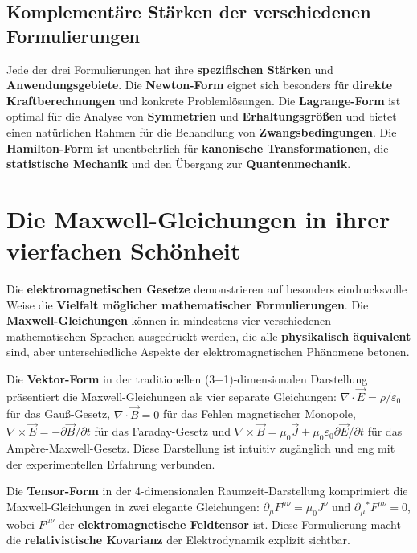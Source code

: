 \documentclass[12pt,a4paper]{report}
\begin{document}
	\subsection{Komplementäre Stärken der verschiedenen Formulierungen}
	
	Jede der drei Formulierungen hat ihre \textbf{spezifischen Stärken} und \textbf{Anwendungsgebiete}. Die \textbf{Newton-Form} eignet sich besonders für \textbf{direkte Kraftberechnungen} und konkrete Problemlösungen. Die \textbf{Lagrange-Form} ist optimal für die Analyse von \textbf{Symmetrien} und \textbf{Erhaltungsgrößen} und bietet einen natürlichen Rahmen für die Behandlung von \textbf{Zwangsbedingungen}. Die \textbf{Hamilton-Form} ist unentbehrlich für \textbf{kanonische Transformationen}, die \textbf{statistische Mechanik} und den Übergang zur \textbf{Quantenmechanik}.
	
	\section{Die Maxwell-Gleichungen in ihrer vierfachen Schönheit}
	
	Die \textbf{elektromagnetischen Gesetze} demonstrieren auf besonders eindrucksvolle Weise die \textbf{Vielfalt möglicher mathematischer Formulierungen}. Die \textbf{Maxwell-Gleichungen} können in mindestens vier verschiedenen mathematischen Sprachen ausgedrückt werden, die alle \textbf{physikalisch äquivalent} sind, aber unterschiedliche Aspekte der elektromagnetischen Phänomene betonen.
	
	Die \textbf{Vektor-Form} in der traditionellen (3+1)-dimensionalen Darstellung präsentiert die Maxwell-Gleichungen als vier separate Gleichungen: $\nabla \cdot \vec{E} = \rho/\varepsilon_0$ für das Gauß-Gesetz, $\nabla \cdot \vec{B} = 0$ für das Fehlen magnetischer Monopole, $\nabla \times \vec{E} = -\partial \vec{B}/\partial t$ für das Faraday-Gesetz und $\nabla \times \vec{B} = \mu_0 \vec{J} + \mu_0 \varepsilon_0 \partial \vec{E}/\partial t$ für das Ampère-Maxwell-Gesetz. Diese Darstellung ist intuitiv zugänglich und eng mit der experimentellen Erfahrung verbunden.
	
	Die \textbf{Tensor-Form} in der 4-dimensionalen Raumzeit-Darstellung komprimiert die Maxwell-Gleichungen in zwei elegante Gleichungen: $\partial_\mu F^{\mu\nu} = \mu_0 J^\nu$ und $\partial_\mu {}^*F^{\mu\nu} = 0$, wobei $F^{\mu\nu}$ der \textbf{elektromagnetische Feldtensor} ist. Diese Formulierung macht die \textbf{relativistische Kovarianz} der Elektrodynamik explizit sichtbar.
	
\end{document}
